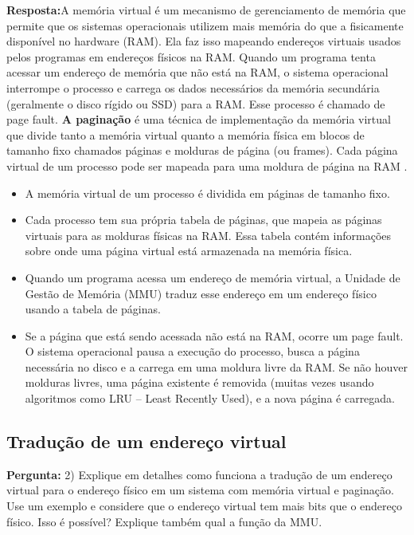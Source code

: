 \documentclass{article}
\begin{document}
\textbf{Resposta:}A memória virtual é um mecanismo de gerenciamento de memória que permite que os sistemas operacionais utilizem mais memória do que a fisicamente disponível no hardware (RAM). Ela faz isso mapeando endereços virtuais usados pelos programas em endereços físicos na RAM. Quando um programa tenta acessar um endereço de memória que não está na RAM, o sistema operacional interrompe o processo e carrega os dados necessários da memória secundária (geralmente o disco rígido ou SSD) para a RAM. Esse processo é chamado de page fault.
\textbf{A paginação} é uma técnica de implementação da memória virtual que divide tanto a memória virtual quanto a memória física em blocos de tamanho fixo chamados páginas e molduras de página (ou frames). Cada página virtual de um processo pode ser mapeada para uma moldura de página na RAM \cite{tanenbaum2021,escolaLBK2024}.
\begin{itemize}
    \item  A memória virtual de um processo é dividida em páginas de tamanho fixo.
    \item Cada processo tem sua própria tabela de páginas, que mapeia as páginas virtuais para as molduras físicas na RAM. Essa tabela contém informações sobre onde uma página virtual está armazenada na memória física.
    \item  Quando um programa acessa um endereço de memória virtual, a Unidade de Gestão de Memória (MMU) traduz esse endereço em um endereço físico usando a tabela de páginas.
    \item Se a página que está sendo acessada não está na RAM, ocorre um page fault. O sistema operacional pausa a execução do processo, busca a página necessária no disco e a carrega em uma moldura livre da RAM. Se não houver molduras livres, uma página existente é removida (muitas vezes usando algoritmos como LRU – Least Recently Used), e a nova página é carregada.
\end{itemize}

\subsection{Tradução de um endereço virtual}

\textbf{Pergunta:} 2) Explique em detalhes como funciona a tradução de um endereço virtual para o endereço físico em um sistema com memória virtual e paginação. Use um exemplo e considere que o endereço virtual tem mais bits que o endereço físico. Isso é possível? Explique também qual a função da MMU. \newline
\end{document}
